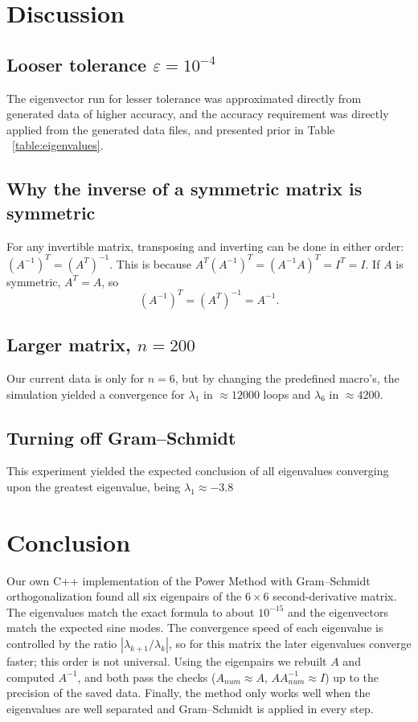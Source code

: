 \documentclass{article}
\begin{document}
\section{Discussion}

\subsection{Looser tolerance $\varepsilon = 10^{-4}$}
The eigenvector run for lesser tolerance was approximated directly from generated data of higher accuracy, and the accuracy requirement was 
directly applied from the generated data files, and presented prior in Table ~\ref{table:eigenvalues}.

\subsection{Why the inverse of a symmetric matrix is symmetric}
For any invertible matrix, transposing and inverting can be done in either order: $(A^{-1})^T = (A^T)^{-1}$.
This is because $A^T (A^{-1})^T = (A^{-1} A)^T = I^T = I$. If $A$ is symmetric, $A^T = A$, so
\begin{equation}
    (A^{-1})^T = (A^T)^{-1} = A^{-1}.
\end{equation}

\subsection{Larger matrix, $n = 200$}
Our current data is only for $n = 6$, but by changing the predefined macro's, the simulation yielded a convergence for $\lambda_{1}$ in $\approx 12000$ loops and $\lambda_{6}$ in $\approx 4200$.
\subsection{Turning off Gram--Schmidt}
This experiment yielded the expected conclusion of all eigenvalues converging upon the greatest eigenvalue, being $\lambda_{1} \approx -3.8$
\section{Conclusion}

Our own C++ implementation of the Power Method with Gram--Schmidt orthogonalization found all six eigenpairs of
the $6\times6$ second-derivative matrix. The eigenvalues match the exact formula to about $10^{-15}$ and the
eigenvectors match the expected sine modes. The convergence speed of each eigenvalue is controlled by the ratio
$|\lambda_{k+1}/\lambda_k|$, so for this matrix the later eigenvalues converge faster; this order is not
universal. Using the eigenpairs we rebuilt $A$ and computed $A^{-1}$, and both pass the checks
($A_{num}\approx A$, $AA^{-1}_{num}\approx I$) up to the precision of the saved data. Finally, the method only
works well when the eigenvalues are well separated and Gram--Schmidt is applied in every step.
\end{document}
